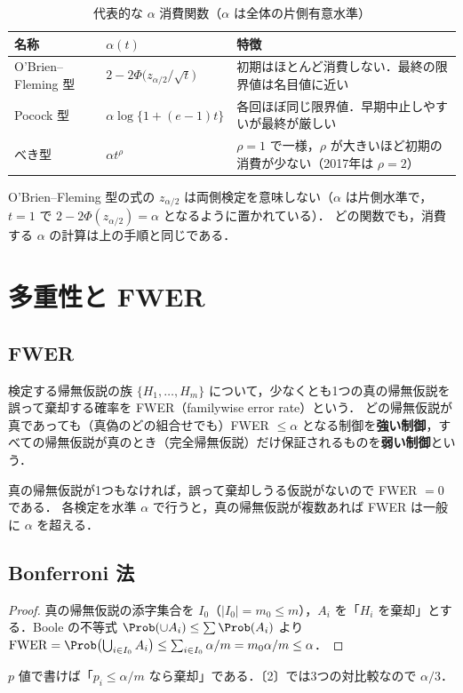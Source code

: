 \begin{table}[htbp]
\centering\small
\caption{代表的な $\alpha$ 消費関数（$\alpha$ は全体の片側有意水準）}\label{tab:14-spending}
\begin{tabular}{@{}llL{62mm}@{}}
\toprule
名称 & $\alpha(t)$ & 特徴\\
\midrule
O'Brien--Fleming 型 & $2-2\Phi\bigl(z_{\alpha/2}/\sqrt t\bigr)$ & 初期はほとんど消費しない．最終の限界値は名目値に近い\\
Pocock 型 & $\alpha\log\{1+(e-1)t\}$ & 各回ほぼ同じ限界値．早期中止しやすいが最終が厳しい\\
べき型 & $\alpha t^\rho$ & $\rho=1$ で一様，$\rho$ が大きいほど初期の消費が少ない（2017年は $\rho=2$）\\
\bottomrule
\end{tabular}
\end{table}
\Youchui O'Brien--Fleming 型の式の $z_{\alpha/2}$ は両側検定を意味しない（$\alpha$ は片側水準で，$t=1$ で $2-2\Phi(z_{\alpha/2})=\alpha$ となるように置かれている）．
どの関数でも，消費する $\alpha$ の計算は上の手順と同じである．

\section{多重性と FWER}\label{sec:14-mult}
\Hissu
\subsection{FWER}
\begin{teigi}[FWER]\label{def:14-fwer}
検定する帰無仮説の族 $\{H_1,\dots,H_m\}$ について，少なくとも1つの真の帰無仮説を誤って棄却する確率を FWER（familywise error rate）という．
どの帰無仮説が真であっても（真偽のどの組合せでも）FWER $\le\alpha$ となる制御を\textbf{強い制御}，すべての帰無仮説が真のとき（完全帰無仮説）だけ保証されるものを\textbf{弱い制御}という．
\end{teigi}
真の帰無仮説が1つもなければ，誤って棄却しうる仮説がないので FWER $=0$ である．
各検定を水準 $\alpha$ で行うと，真の帰無仮説が複数あれば FWER は一般に $\alpha$ を超える．

\subsection{Bonferroni 法}
\begin{proof}
真の帰無仮説の添字集合を $I_0$（$|I_0|=m_0\le m$），$A_i$ を「$H_i$ を棄却」とする．Boole の不等式 $\Prob(\cup A_i)\le\sum\Prob(A_i)$ より
$\mathrm{FWER}=\Prob\bigl(\bigcup_{i\in I_0}A_i\bigr)\le\sum_{i\in I_0}\alpha/m=m_0\alpha/m\le\alpha$．
\end{proof}
$p$ 値で書けば「$p_i\le\alpha/m$ なら棄却」である．〔2〕では3つの対比較なので $\alpha/3$．


